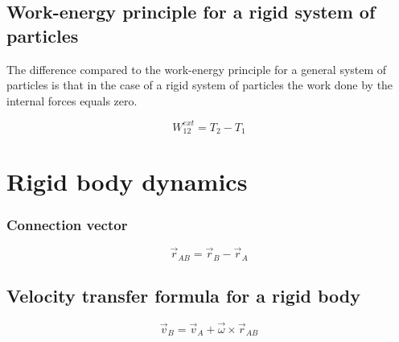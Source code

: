 \documentclass[10pt,a4paper]{scrartcl}
\begin{document}
\begin{multicols*}{2}
\subsection{Work-energy principle for a rigid system of particles}
\label{sec:WERigidSystem}

The difference compared to the work-energy principle for a general system of particles is that in the case of a rigid system of particles the work done by the internal forces equals zero.

\begin{equation*}
W_{12}^{ext}=T_2-T_1
\end{equation*}


\section{Rigid body dynamics}

\subsubsection{Connection vector}

\begin{equation*}
\vec{r}_{AB} = \vec{r}_B-\vec{r}_A
\end{equation*}

\subsection{Velocity transfer formula for a rigid body}

\begin{equation*}
\vec{v}_B=\vec{v}_A+\vec{\omega}\times\vec{r}_{AB}
\end{equation*}



\end{multicols*}
\end{document}
